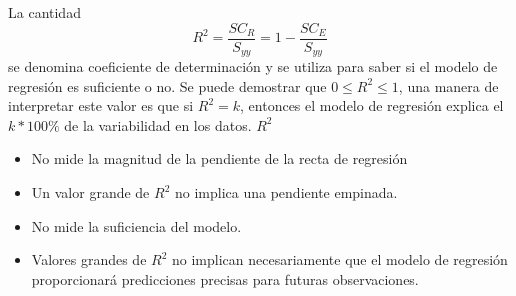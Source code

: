La cantidad
\begin{equation}
R^{2}=\frac{SC_{R}}{S_{yy}}=1-\frac{SC_{E}}{S_{yy}}
\end{equation}
se denomina coeficiente de determinaci\'on y se utiliza para saber si el modelo de regresi\'on es suficiente o no. Se puede demostrar que $0\leq R^{2}\leq1$, una manera de interpretar este valor es que si $R^{2}=k$, entonces el modelo de regresi\'on explica el $k*100\%$ de la variabilidad en los datos.
$R^{2}$ 
\begin{itemize}
\item No mide la magnitud de la pendiente de la recta de regresi\'on
\item Un valor grande de $R^{2}$ no implica una pendiente empinada.
\item No mide la suficiencia del modelo.
\item Valores grandes de $R^{2}$ no implican necesariamente que el modelo de regresi\'on proporcionar\'a predicciones precisas para futuras observaciones.
\end{itemize}



